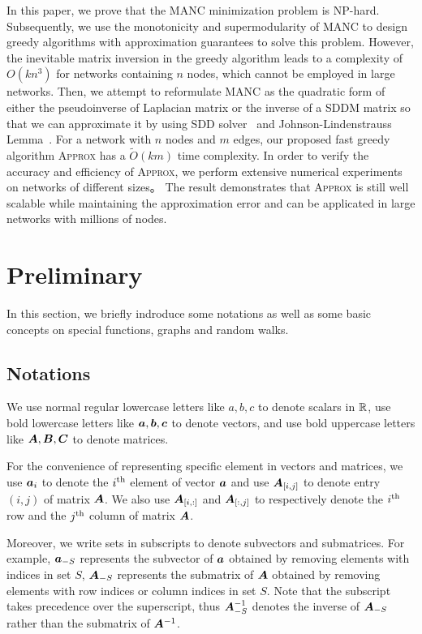 \documentclass[sigconf]{acmart}
\begin{document}
In this paper, we prove that the MANC minimization problem is NP-hard.
Subsequently, we use the monotonicity and supermodularity of MANC to design greedy algorithms with approximation guarantees to solve this problem.
However, the inevitable matrix inversion in the greedy algorithm leads to a complexity of \(O(kn^3)\) for networks containing \(n\) nodes, which cannot be employed in large networks.
Then, we attempt to reformulate MANC as the quadratic form of either the pseudoinverse of Laplacian matrix or the inverse of a SDDM matrix so that we can approximate it by using SDD solver~\cite{CoKyMiPaJaPeRaXu14,SpTe14} and Johnson-Lindenstrauss Lemma~\cite{JoLi84}.
For a network with \(n\) nodes and \(m\) edges, our proposed fast greedy algorithm \textsc{Approx} has a \(\tilde{O}(km)\) time complexity.
In order to verify the accuracy and efficiency of \textsc{Approx}, we perform extensive numerical experiments on networks of different sizes。
The result demonstrates that \textsc{Approx} is still well scalable while maintaining the approximation error and can be applicated in large networks with millions of nodes.

\section{Preliminary}\label{sec:prelim}

In this section, we briefly indroduce some notations as well as some basic concepts on special functions, graphs and random walks.

\subsection{Notations}

We use normal regular lowercase letters like \(a,b,c\) to denote scalars in \(\mathbb{R}\), use bold lowercase letters like \(\boldsymbol{a},\boldsymbol{b},\boldsymbol{c}\) to denote vectors, and use bold uppercase letters like \(\boldsymbol{A},\boldsymbol{B},\boldsymbol{C}\) to denote matrices.

For the convenience of representing specific element in vectors and matrices, we use \(\boldsymbol{a}_{i}\) to denote the \({i}^{\rm{th}}\) element of vector \(\boldsymbol{a}\) and use \(\boldsymbol{A}_{[i,j]}\) to denote entry \((i,j)\) of matrix \(\boldsymbol{A}\).
We also use \(\boldsymbol{A}_{[i,:]}\) and \(\boldsymbol{A}_{[:,j]}\) to respectively denote the \({i}^{\rm{th}}\) row and the \({j}^{\rm{th}}\) column of matrix \(\boldsymbol{A}\).

Moreover, we write sets in subscripts to denote subvectors and submatrices.
For example, \(\boldsymbol{a}_{-S}\) represents the subvector of \(\boldsymbol{a}\) obtained by removing elements with indices in set \(S\), \(\boldsymbol{A}_{-S}\) represents the submatrix of \(\boldsymbol{A}\) obtained by removing elements with row indices or column indices in set \(S\).
Note that the subscript takes precedence over the superscript, thus \(\boldsymbol{A}_{-S}^{-1}\) denotes the inverse of \(\boldsymbol{A}_{-S}\) rather than the submatrix of \(\boldsymbol{A}^{-1}\).
\end{document}
